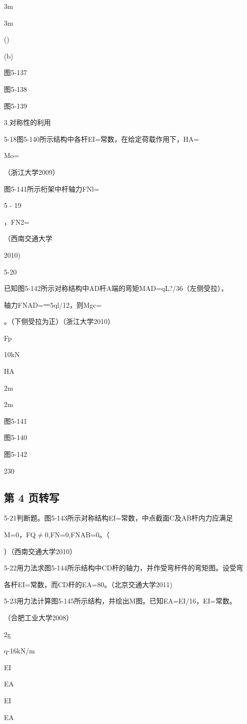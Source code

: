 3m

3m

()

(b)

图5-137

图5-138

图5-139

3.对称性的利用

5-18图5-140所示结构中各杆EI=常数，在给定荷载作用下，HA=

Mo=

（浙江大学2009）

图5-141所示桁架中杆轴力FNl=

5 - 19

，FN2=

（西南交通大学

2010)

5-20

已知图5-142所示对称结构中AD杆A端的弯矩MAD=qL?/36（左侧受拉），

轴力FNAD=一5ql/12，则Mgc=

。（下侧受拉为正）（浙江大学2010）

Fp

10kN

HA

2m

2m

图5-141

图5-140

图5-142

230

\subsection*{第 4 页转写}
5-21判断题。图5-143所示对称结构EI=常数，中点截面C及AB杆内力应满足

M=0，FQ$\ne$0,FN=0,FNAB=0。（

）（西南交通大学2010）

5-22用力法求图5-144所示结构中CD杆的轴力，并作受弯杆件的弯矩图。设受弯

各杆EI=常数，而CD杆的EA=80。（北京交通大学2011)

5-23用力法计算图5-145所示结构，并绘出M图。已知EA=EI/16，EI=常数。

（合肥工业大学2008）

2g

q-16kN/m

EI

EA

EI

EA

